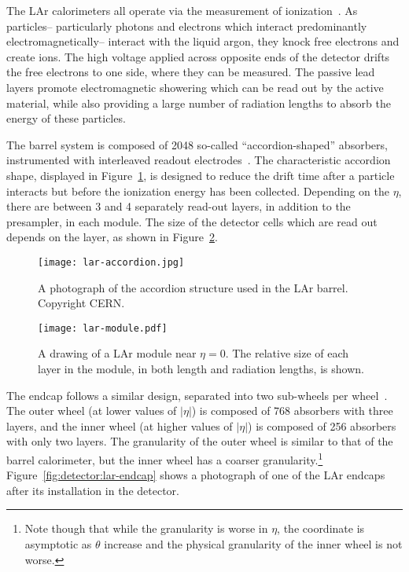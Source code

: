 The LAr calorimeters all operate via the measurement of ionization~\cite{Detectors,Wigmans}. As particles-- particularly photons and electrons which interact predominantly electromagnetically-- interact with the liquid argon, they knock free electrons and create ions. The high voltage applied across opposite ends of the detector drifts the free electrons to one side, where they can be measured. The passive lead layers promote electromagnetic showering which can be read out by the active material, while also providing a large number of radiation lengths to absorb the energy of these particles.

The barrel system is composed of 2048 so-called ``accordion-shaped'' absorbers, instrumented with interleaved readout electrodes~\cite{ATLASPaper}. The characteristic accordion shape, displayed in Figure~\ref{fig:detector:lar-accordion}, is designed to reduce the drift time after a particle interacts but before the ionization energy has been collected. Depending on the $\eta$, there are between 3 and 4 separately read-out layers, in addition to the presampler, in each module. The size of the detector cells which are read out depends on the layer, as shown in Figure~\ref{fig:detector:lar-module}. 


\begin{figure}
\centering
\texttt{[image: lar-accordion.jpg]}
\label{fig:detector:lar-accordion}
\caption{A photograph of the accordion structure used in the LAr barrel. Copyright CERN.}
\end{figure}



\begin{figure}
\centering
\texttt{[image: lar-module.pdf]}
\label{fig:detector:lar-module}
\caption{A drawing of a LAr module near $\eta = 0$. The relative size of each layer in the module, in both length and radiation lengths, is shown.}
\end{figure}




The endcap follows a similar design, separated into two sub-wheels per wheel~\cite{ATLASPaper}. The outer wheel (at lower values of $|\eta|$) is composed of 768 absorbers with three layers, and the inner wheel (at higher values of $|\eta|$) is composed of 256 absorbers with only two layers. The granularity of the outer wheel is similar to that of the barrel calorimeter, but the inner wheel has a coarser granularity.\footnote{Note though that while the granularity is worse in $\eta$, the coordinate is asymptotic as $\theta$ increase and the physical granularity of the inner wheel is not worse.} Figure~\ref{fig:detector:lar-endcap} shows a photograph of one of the LAr endcaps after its installation in the detector.


